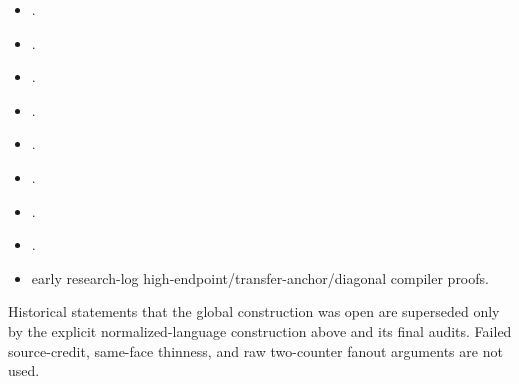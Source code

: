 \documentclass[11pt,a4paper]{article}
\theoremstyle{remark}
\begin{document}
\begin{itemize}[nosep]

\item {}.

\item {}.

\item {}.

\item {}.

\item {}.

\item {}.

\item {}.

\item {}.

\item early research-log high-endpoint/transfer-anchor/diagonal compiler proofs.

\end{itemize}

Historical statements that the global construction was open are superseded only by the explicit normalized-language construction above and its final audits. Failed source-credit, same-face thinness, and raw two-counter fanout arguments are not used.
\end{document}
